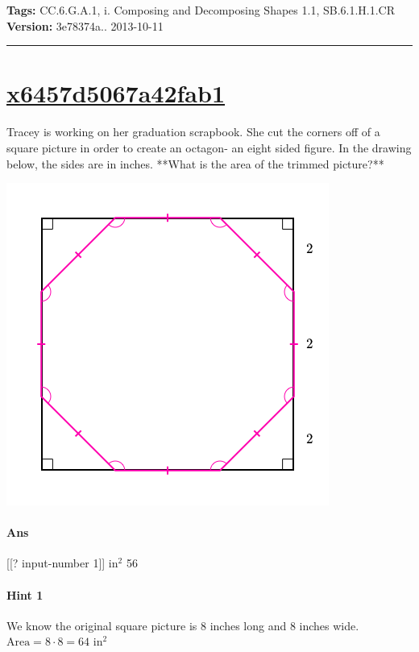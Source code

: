 \documentclass[twocolumn,10pt]{article}
\def\shrinkfactor{0.55}
\begin{document}
\medskip
\noindent
\textbf{Tags:} {\footnotesize CC.6.G.A.1, i.	Composing and Decomposing Shapes 1.1, SB.6.1.H.1.CR}\\
\textbf{Version:} 3e78374a.. 2013-10-11
\smallskip\hrule





\section{\href{https://www.khanacademy.org/devadmin/content/items/x6457d5067a42fab1}{x6457d5067a42fab1}}

\noindent
Tracey is working on her graduation scrapbook.  She cut the corners off of a square picture in order to create an octagon- an eight sided figure.  In the drawing below, the sides are in inches.  **What is the area of the trimmed picture?**  


\includegraphics[scale=\shrinkfactor]{figures/594b710dd149095c7310e73a8ff73437fd084a77.png}

\paragraph{Ans}  [[? input-number 1]] $\text{in}^2$  56

\paragraph{Hint 1}We know the original square picture is $8$ inches long and $8$ inches wide.  
${\text{Area}}=8\cdot8=64\text{ in}^2$  
\end{document}
